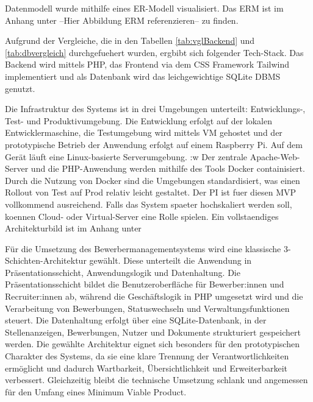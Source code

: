 Datenmodell wurde mithilfe eines ER-Modell visualisiert.
Das ERM ist im Anhang unter --Hier Abbildung ERM referenzieren-- zu finden.

Aufgrund der Vergleiche, die in den Tabellen \ref{tab:vglBackend} und \ref{tab:dbvergleich} durchgefuehert wurden, ergbibt sich folgender Tech-Stack.
Das Backend wird mittels PHP, das Frontend via dem CSS Framework Tailwind implementiert und als Datenbank wird das leichgewichtige SQLite DBMS genutzt.

Die Infrastruktur des Systems ist in drei Umgebungen unterteilt: Entwicklungs-, Test- und Produktivumgebung. 
Die Entwicklung erfolgt auf der lokalen Entwicklermaschine, die Testumgebung wird mittels VM gehostet und der prototypische Betrieb der Anwendung erfolgt auf einem Raspberry Pi. 
Auf dem Gerät läuft eine Linux-basierte Serverumgebung. :w
Der zentrale Apache-Web-Server und die PHP-Anwendung werden mithilfe des Tools Docker containisiert.
Durch die Nutzung von Docker sind die Umgebungen standardisiert, was einen Rollout von Test auf Prod relativ leicht gestaltet.
Der PI ist fuer diesen MVP vollkommend ausreichend. Falls das System spaeter hochskaliert werden soll, koennen Cloud- oder Virtual-Server eine Rolle spielen.
Ein vollstaendiges Architekturbild ist im Anhang unter 

Für die Umsetzung des Bewerbermanagementsystems wird eine klassische 3-Schichten-Architektur gewählt. 
Diese unterteilt die Anwendung in Präsentationsschicht, Anwendungslogik und Datenhaltung. 
Die Präsentationsschicht bildet die Benutzeroberfläche für Bewerber:innen und Recruiter:innen ab, während die Geschäftslogik in PHP umgesetzt wird und die Verarbeitung von Bewerbungen, Statuswechseln und Verwaltungsfunktionen steuert. 
Die Datenhaltung erfolgt über eine SQLite-Datenbank, in der Stellenanzeigen, Bewerbungen, Nutzer und Dokumente strukturiert gespeichert werden.
Die gewählte Architektur eignet sich besonders für den prototypischen Charakter des Systems, da sie eine klare Trennung der Verantwortlichkeiten ermöglicht und dadurch Wartbarkeit, Übersichtlichkeit und Erweiterbarkeit verbessert. Gleichzeitig bleibt die technische Umsetzung schlank und angemessen für den Umfang eines Minimum Viable Product.
